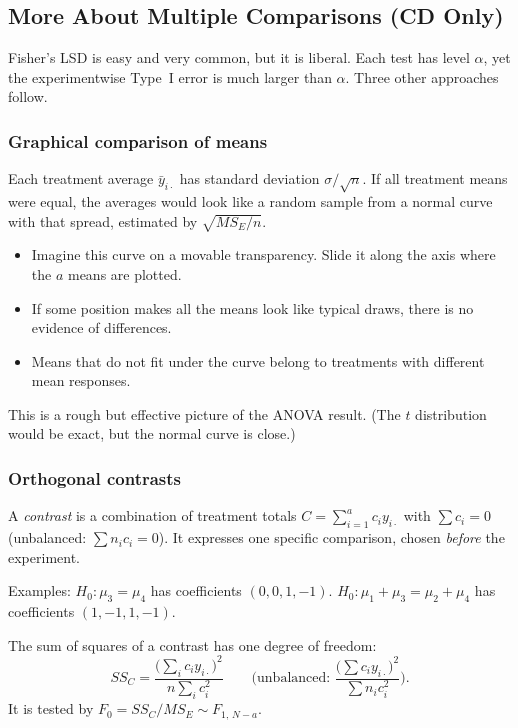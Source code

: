 \subsection{More About Multiple Comparisons (CD Only)}

Fisher's LSD is easy and very common, but it is liberal. Each test has level $\alpha$, yet the experimentwise Type~I error is much larger than $\alpha$. Three other approaches follow.

\subsubsection*{Graphical comparison of means}

Each treatment average $\bar{y}_{i\cdot}$ has standard deviation $\sigma/\sqrt n$. If all treatment means were equal, the averages would look like a random sample from a normal curve with that spread, estimated by $\sqrt{MS_E/n}$.
\begin{itemize}
  \item Imagine this curve on a movable transparency. Slide it along the axis where the $a$ means are plotted.
  \item If some position makes all the means look like typical draws, there is no evidence of differences.
  \item Means that do not fit under the curve belong to treatments with different mean responses.
\end{itemize}
This is a rough but effective picture of the ANOVA result. (The $t$ distribution would be exact, but the normal curve is close.)

\subsubsection*{Orthogonal contrasts}

\begin{definition}[Contrast]
A \emph{contrast} is a combination of treatment totals $C=\sum_{i=1}^ac_iy_{i\cdot}$ with $\sum c_i=0$ (unbalanced: $\sum n_ic_i=0$). It expresses one specific comparison, chosen \emph{before} the experiment.
\end{definition}
Examples: $H_0:\mu_3=\mu_4$ has coefficients $(0,0,1,-1)$. $H_0:\mu_1+\mu_3=\mu_2+\mu_4$ has coefficients $(1,-1,1,-1)$.

The sum of squares of a contrast has one degree of freedom:
\[ SS_C=\frac{\big(\sum_ic_iy_{i\cdot}\big)^2}{n\sum_ic_i^2}\qquad\Big(\text{unbalanced: }\frac{\big(\sum c_iy_{i\cdot}\big)^2}{\sum n_ic_i^2}\Big). \]
It is tested by $F_0=SS_C/MS_E\sim F_{1,\,N-a}$.


